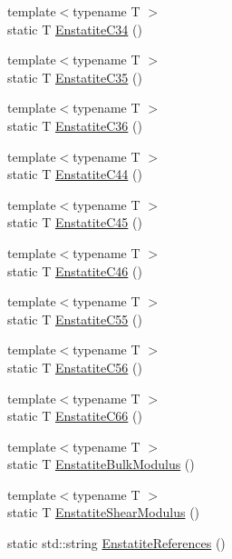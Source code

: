 \begin{DoxyCompactItemize}
{\footnotesize template$<$typename T $>$ }\\static T \mbox{\hyperlink{namespacempc_1_1data_a99824307f06e163bddfd1ce49e3b383f}{Enstatite\+C34}} ()
\item 
{\footnotesize template$<$typename T $>$ }\\static T \mbox{\hyperlink{namespacempc_1_1data_a6ed675e5fbbebf4900e1a1af0c9f4c12}{Enstatite\+C35}} ()
\item 
{\footnotesize template$<$typename T $>$ }\\static T \mbox{\hyperlink{namespacempc_1_1data_a747e54faa968aab58dc44d77e739d506}{Enstatite\+C36}} ()
\item 
{\footnotesize template$<$typename T $>$ }\\static T \mbox{\hyperlink{namespacempc_1_1data_adf6d75242b2a375096608982c9eee7b8}{Enstatite\+C44}} ()
\item 
{\footnotesize template$<$typename T $>$ }\\static T \mbox{\hyperlink{namespacempc_1_1data_a9278bf5c91ccef7355d026b4bcf32ef7}{Enstatite\+C45}} ()
\item 
{\footnotesize template$<$typename T $>$ }\\static T \mbox{\hyperlink{namespacempc_1_1data_a623660a7d924db21002f5b42c8260f4c}{Enstatite\+C46}} ()
\item 
{\footnotesize template$<$typename T $>$ }\\static T \mbox{\hyperlink{namespacempc_1_1data_ab487cfab49eb0356b1b55c3befee0f03}{Enstatite\+C55}} ()
\item 
{\footnotesize template$<$typename T $>$ }\\static T \mbox{\hyperlink{namespacempc_1_1data_abf3ee91245d7fc44fc0295e256b8577b}{Enstatite\+C56}} ()
\item 
{\footnotesize template$<$typename T $>$ }\\static T \mbox{\hyperlink{namespacempc_1_1data_a25d90ccb5769ec96e25b6b73b5d35fc2}{Enstatite\+C66}} ()
\item 
{\footnotesize template$<$typename T $>$ }\\static T \mbox{\hyperlink{namespacempc_1_1data_a2fbaa089488566ff8671dd75973d5f0d}{Enstatite\+Bulk\+Modulus}} ()
\item 
{\footnotesize template$<$typename T $>$ }\\static T \mbox{\hyperlink{namespacempc_1_1data_a8f0180d14be94290170f12b5f4f688bd}{Enstatite\+Shear\+Modulus}} ()
\item 
static std\+::string \mbox{\hyperlink{namespacempc_1_1data_aec2c8a31edd1909ddcd56cf97aa7eedc}{Enstatite\+References}} ()

\end{DoxyCompactItemize}
